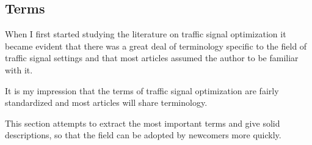 \subsection{Terms}
\label{vocabulary}
When I first started studying the literature on traffic signal optimization \cite{forprojekt} it became evident that there was a great deal of terminology specific to the field of traffic signal settings and that most articles assumed the author to be familiar with it. 

It is my impression that the terms of traffic signal optimization are fairly standardized and most articles will share terminology.

This section attempts to extract the most important terms and give solid descriptions, so that the field can be adopted by newcomers more quickly.

